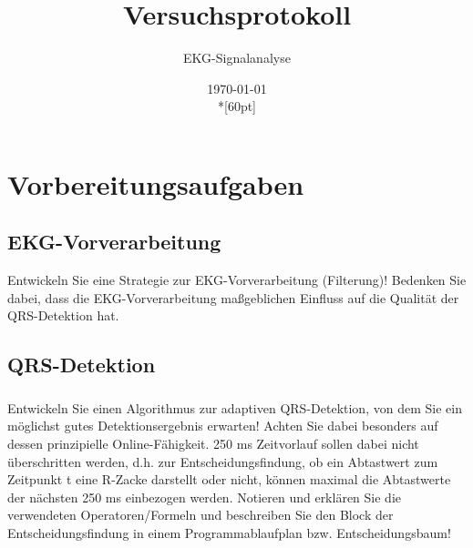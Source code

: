 \documentclass[a4paper,12pt,titlepage]{scrartcl}
\begin{document}
\titlehead
{
    \small
    {
        Technische Universität Ilmenau\\
        Fakulät IA\\
        Fachgebiet Biosignalverarbeitung\\

        Praktikum EKG-Signalanalyse\\
        WS 2021/22}
}

\title {Versuchsprotokoll}
\subtitle{EKG-Signalanalyse}
\author{}
\date{\today\\*[60pt]}
\maketitle  %

\pagestyle{fancy}
\newpage

\section{Vorbereitungsaufgaben}
\subsection{EKG-Vorverarbeitung}
Entwickeln Sie eine Strategie zur EKG-Vorverarbeitung (Filterung)! Bedenken Sie dabei, dass die EKG-Vorverarbeitung maßgeblichen Einfluss auf die Qualität der QRS-Detektion hat.

\subsection{QRS-Detektion}
\subsubsection{}
Entwickeln Sie einen Algorithmus zur adaptiven QRS-Detektion, von dem Sie ein möglichst gutes Detektionsergebnis erwarten! Achten Sie dabei besonders auf dessen prinzipielle Online-Fähigkeit. 250 ms Zeitvorlauf sollen dabei nicht überschritten werden, d.h. zur Entscheidungsfindung, ob ein Abtastwert zum Zeitpunkt t eine R-Zacke darstellt oder nicht, können maximal die Abtastwerte der nächsten 250 ms einbezogen werden. Notieren und erklären Sie die verwendeten Operatoren/Formeln und beschreiben Sie den Block der Entscheidungsfindung in einem Programmablaufplan bzw. Entscheidungsbaum!
\end{document}
